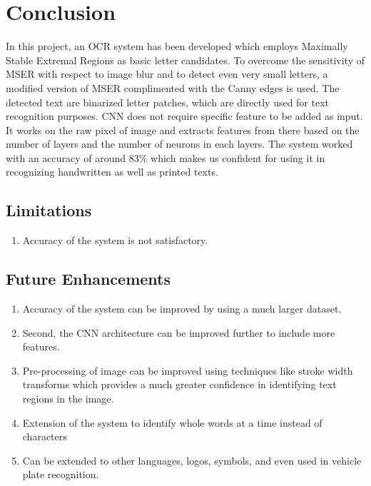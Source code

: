 \chapter{Conclusion}

In this project, an OCR system has been developed which employs Maximally Stable Extremal Regions as basic letter candidates. To overcome the sensitivity of MSER with respect to image blur and to detect even very small letters, a modified version of MSER complimented with the Canny edges is used. The detected text are binarized letter patches, which are directly used for text recognition purposes. CNN does not require specific feature to be added as input. It works on the raw pixel of image and extracts features from there based on the number of layers and the number of neurons in each layers. The system worked with an accuracy of around 83\% which makes us confident for using it in recognizing handwritten as well as printed texts.

\section{Limitations}
\begin{enumerate}
\item Accuracy of the system is not satisfactory.
\end{enumerate}

\section{Future Enhancements}
\begin{enumerate}
\item Accuracy of the system can be improved by using a much larger dataset.
\item Second, the CNN architecture can be improved further to include more features.
\item Pre-processing of image can be improved using techniques like stroke width transforms which provides a much greater confidence in identifying text regions in the image.
\item Extension of the system to identify whole words at a time instead of characters
\item Can be extended to other languages, logos, symbols, and even used in vehicle plate recognition.
\end{enumerate}
